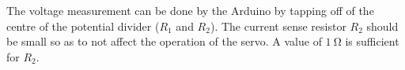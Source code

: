\documentclass[11pt]{article}
\begin{document}
The voltage measurement can be done by the Arduino by tapping off of the centre of the potential divider ($R_1$ and $R_2$).
The current sense resistor $R_2$ should be small so as to not affect the operation of the servo.
A value of $\SI{1}{\ohm}$ is sufficient for $R_2$.
\end{document}
